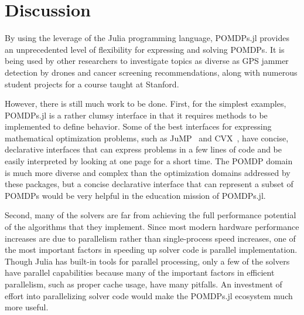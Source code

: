 \section{Discussion}

By using the leverage of the Julia programming language, POMDPs.jl provides an unprecedented level of flexibility for expressing and solving POMDPs. It is being used by other researchers to investigate topics as diverse as GPS jammer detection by drones and cancer screening recommendations, along with numerous student projects for a course taught at Stanford.

However, there is still much work to be done.
First, for the simplest examples, POMDPs.jl is a rather clumsy interface in that it requires methods to be implemented to define behavior.
Some of the best interfaces for expressing mathematical optimization problems, such as JuMP~\cite{dunning2017jump} and CVX~\cite{grant2014cvx}, have concise, declarative interfaces that can express problems in a few lines of code and be easily interpreted by looking at one page for a short time.
The POMDP domain is much more diverse and complex than the optimization domains addressed by these packages, but a concise declarative interface that can represent a subset of POMDPs would be very helpful in the education mission of POMDPs.jl.

Second, many of the solvers are far from achieving the full performance potential of the algorithms that they implement.
Since most modern hardware performance increases are due to parallelism rather than single-process speed increases, one of the most important factors in speeding up solver code is parallel implementation.
Though Julia has built-in tools for parallel processing, only a few of the solvers have parallel capabilities because many of the important factors in efficient parallelism, such as proper cache usage, have many pitfalls.
An investment of effort into parallelizing solver code would make the POMDPs.jl ecosystem much more useful.
